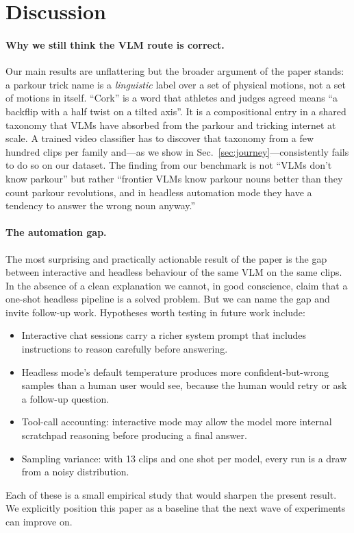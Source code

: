 \section{Discussion}
\label{sec:discussion}

\paragraph{Why we still think the VLM route is correct.}
Our main results are unflattering but the broader argument of the
paper stands: a parkour trick name is a \emph{linguistic} label over
a set of physical motions, not a set of motions in itself. ``Cork''
is a word that athletes and judges agreed means ``a backflip with a
half twist on a tilted axis''. It is a compositional entry in a
shared taxonomy that VLMs have absorbed from the parkour and tricking
internet at scale. A trained video classifier has to discover that
taxonomy from a few hundred clips per family and---as we show in
Sec.~\ref{sec:journey}---consistently fails to do so on our dataset.
The finding from our benchmark is not ``VLMs don't know parkour''
but rather ``frontier VLMs know parkour nouns better than they count
parkour revolutions, and in headless automation mode they have a
tendency to answer the wrong noun anyway.''

\paragraph{The automation gap.}
The most surprising and practically actionable result of the paper
is the gap between interactive and headless behaviour of the same
VLM on the same clips. In the absence of a clean explanation we
cannot, in good conscience, claim that a one-shot headless pipeline
is a solved problem. But we can name the gap and invite follow-up
work. Hypotheses worth testing in future work include:
\begin{itemize}
  \setlength\itemsep{-1pt}
  \item Interactive chat sessions carry a richer system prompt that
        includes instructions to reason carefully before answering.
  \item Headless mode's default temperature produces more
        confident-but-wrong samples than a human user would see,
        because the human would retry or ask a follow-up question.
  \item Tool-call accounting: interactive mode may allow the model
        more internal scratchpad reasoning before producing a final
        answer.
  \item Sampling variance: with 13 clips and one shot per model,
        every run is a draw from a noisy distribution.
\end{itemize}
Each of these is a small empirical study that would sharpen the
present result. We explicitly position this paper as a baseline that
the next wave of experiments can improve on.

